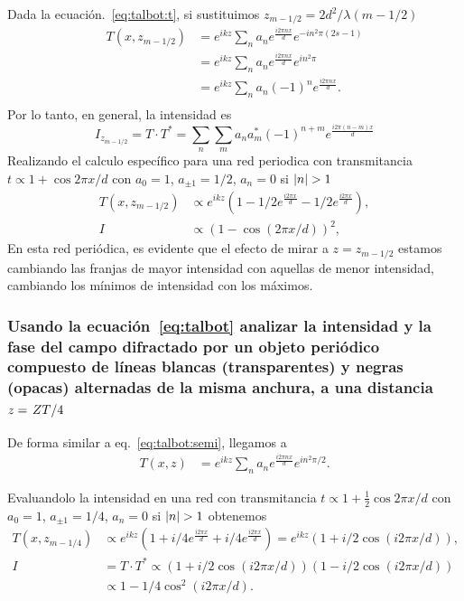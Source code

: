 \documentclass{./packages/optica-article}
\begin{document}
Dada la ecuación.~\ref{eq:talbot:t}, si sustituimos $z_{m-1/2} = 2d^2/\lambda (m - 1/2)$
\nopagebreak
\begin{align*}
	T(x,z_{m - 1/2}) & =
	e^{ikz}
	\sum_{n} a_n e^{\frac{i 2 \pi n x} {d}} e^{- i n^2 \pi (2s - 1)} \\
	                 & =
	e^{ikz}
	\sum_{n} a_n e^{\frac{i 2 \pi n x} {d}} e^{ i n^2 \pi}           \\
	                 & =
	e^{ikz}
	\sum_{n} a_n (-1)^{n}e^{\frac{i 2 \pi n x} {d}}.                 \\
\end{align*}
Por lo tanto, en general, la intensidad es
\begin{equation}\label{eq:talbot:semi}
	I_{z_{m - 1/2}} = T \cdot T^{*}  =
	\sum_{n} \sum_{m} a_n a_{m}^{*} (-1)^{n + m}e^{\frac{i 2 \pi (n - m)  x} {d}}
\end{equation}
Realizando el calculo específico para una red periodica con transmitancia $t \propto 1 + \cos{2\pi x / d}$  con $a_0=1$, $a_{\pm 1}=1/2$, $a_n = 0$ si $\abs{n} > 1$
\nopagebreak
\begin{align*}
	T(x,z_{m-1/2}) & \propto
	e^{ikz}\left(
	1-1/2
	e^{\frac{i 2 \pi  x} {d}}-1/2
	e^{\frac{i 2 \pi  x} {d}}
	\right),                 \\
	I              & \propto
	\left(
	1-\cos (2 \pi  x / d)
	\right)^{2},
\end{align*}
En esta red periódica, es evidente que el efecto de mirar a $z=z_{m-1/2}$ estamos cambiando las franjas de mayor intensidad con aquellas de menor intensidad, cambiando los mínimos de intensidad con los máximos.

\subsubsection{Usando la ecuación~\ref{eq:talbot} analizar la intensidad y la fase del campo difractado por un objeto periódico compuesto de líneas blancas (transparentes) y negras (opacas) alternadas de la misma anchura, a una distancia $z=\flatfrac{ZT}{4}$
}
De forma similar a eq.~\ref{eq:talbot:semi}, llegamos a
\begin{align}
	T(x,z) & =
	e^{ikz}
	\sum_{n} a_n e^{\frac{i 2 \pi n x} {d}}e^{i n^{2} \pi / 2}.
\end{align}

Evaluandolo la intensidad en una red con transmitancia $t \propto 1 + \frac{1}{2}\cos{2\pi x / d}$  con $a_0=1$, $a_{\pm 1}=1/4$, $a_n = 0$ si $\abs{n} > 1$
obtenemos
\nopagebreak
\begin{align*}
	T(x,z_{m-1/4}) & \propto
	e^{ikz}\left(
	1
	+i/4 e^{\frac{i 2 \pi  x} {d}}
	+i/4 e^{\frac{i 2 \pi  x} {d}}
	\right) = e^{ikz}
	\left(
	1
	+i/2 \cos(i 2 \pi  x /d)
	\right)
	,                                         \\
	I              & =  T \cdot T^{*} \propto
	\left(
	1
	+i/2 \cos(i 2 \pi  x /d)
	\right)
	\left(
	1
	-i/2 \cos(i 2 \pi  x /d)
	\right)                                   \\
	               & \propto
	1 - 1/4 \cos^{2}(i 2 \pi  x /d).
\end{align*}
\end{document}
